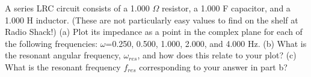         A series LRC circuit consists of a 1.000 $\Omega$ resistor, a
        1.000 F capacitor, and a 1.000 H inductor. (These are
        not particularly easy values to find on the shelf at Radio Shack!)\hwendpart
        (a) Plot its impedance as a point in the complex plane for each of
        the following frequencies: $\omega$=0.250, 0.500, 1.000, 2.000, and 4.000 Hz.\hwendpart
        (b) What is the resonant angular frequency, $\omega_{res}$, 
        and how does this relate to your plot?\answercheck\hwendpart
        (c) What is the resonant frequency $f_{res}$ corresponding to your answer in part b?\answercheck
